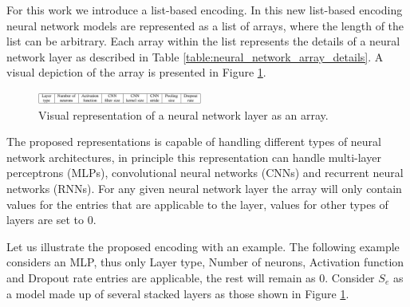 \documentclass[journal]{IEEEtran}
\begin{document}
For this work we introduce a list-based encoding. In this new list-based encoding neural network models are represented as a list of arrays, where the length of the list can be arbitrary. Each array within the list represents the details of a neural network layer as described in Table \ref{table:neural_network_array_details}. A visual depiction of the array is presented in Figure \ref{fig:neural_network_array}.

\begin{figure}[!htb]
\centering
\includegraphics[width=0.48\textwidth]{img/array_layer.png}
\caption{Visual representation of a neural network layer as an array.}
\label{fig:neural_network_array}
\end{figure}

The proposed representations is capable of handling different types of neural network architectures, in principle this representation can handle multi-layer perceptrons (MLPs), convolutional neural networks (CNNs) and recurrent neural networks (RNNs). For any given neural network layer the array will only contain values for the entries that are applicable to the layer, values for other types of layers are set to 0.

Let us illustrate the proposed encoding with an example. The following example considers an MLP, thus only Layer type, Number of neurons, Activation function and Dropout rate entries are applicable, the rest will remain as 0. Consider $S_e$ as a model made up of several stacked layers as those shown in Figure \ref{fig:neural_network_array}.
\end{document}
